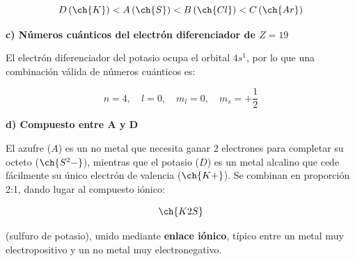 \begin{exerciseEVAU}
\begin{solu}
        \begin{equation*}
            D\,(\ch{K}) < A\,(\ch{S}) < B\,(\ch{Cl}) < C\,(\ch{Ar})
        \end{equation*}

        \textbf{c) Números cuánticos del electrón diferenciador de \(Z=19\)}

        El electrón diferenciador del potasio ocupa el orbital \(4s^1\), por lo que una combinación válida de números cuánticos es:

        \begin{equation*}
            n=4, \quad l=0, \quad m_l=0, \quad m_s=+\dfrac{1}{2}
        \end{equation*}

        \textbf{d) Compuesto entre A y D}

        El azufre (\(A\)) es un no metal que necesita ganar 2 electrones para completar su octeto (\(\ch{S^2-}\)), mientras que el potasio (\(D\)) es un metal alcalino que cede fácilmente su único electrón de valencia (\(\ch{K+}\)). Se combinan en proporción 2:1, dando lugar al compuesto iónico:

        \begin{equation*}
            \ch{K2S}
        \end{equation*}

        (sulfuro de potasio), unido mediante \textbf{enlace iónico}, típico entre un metal muy electropositivo y un no metal muy electronegativo.

    \end{solu}
\end{exerciseEVAU}

